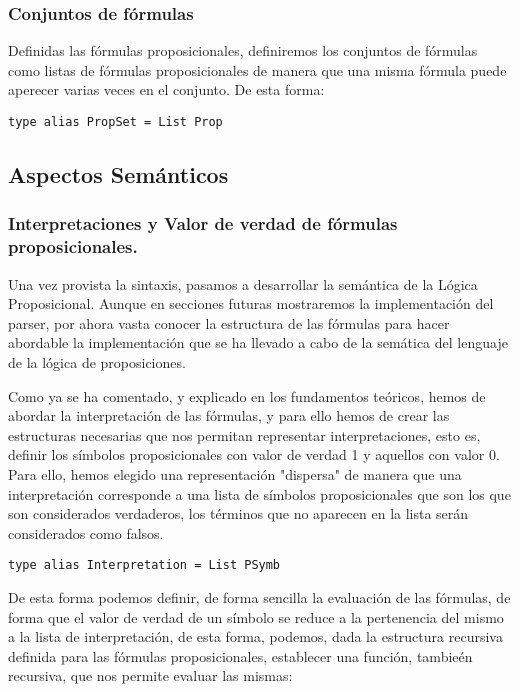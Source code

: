 \documentclass[a4paper]{report}
\begin{document}
\subsubsection{Conjuntos de fórmulas}

Definidas las fórmulas proposicionales, definiremos los conjuntos de fórmulas como listas de fórmulas proposicionales de manera que una misma fórmula puede aperecer varias veces en el conjunto. De esta forma: \\

\begin{lstlisting}[caption= Definición de Conjunto de Fórmulas como Lista de Fórmulas Proposicionales]
type alias PropSet = List Prop
\end{lstlisting}

\subsection{Aspectos Semánticos}
\subsubsection{Interpretaciones y Valor de verdad de fórmulas proposicionales. }

Una vez provista la sintaxis, pasamos a desarrollar la semántica de la Lógica Proposicional. Aunque en secciones futuras mostraremos la implementación del parser, por ahora vasta conocer la estructura de las fórmulas para hacer abordable la implementación que se ha llevado a cabo de la semática del lenguaje de la lógica de proposiciones.

Como ya se ha comentado, y explicado en los fundamentos teóricos, hemos de abordar la interpretación de las fórmulas, y para ello hemos de crear las estructuras necesarias que nos permitan representar interpretaciones, esto es, definir los símbolos proposicionales con valor de verdad 1 y aquellos con valor 0. Para ello, hemos elegido una representación "dispersa" de manera que una interpretación corresponde a una lista de símbolos proposicionales que son los que son considerados verdaderos, los términos que no aparecen en la lista serán considerados como falsos.\\

\begin{lstlisting}[caption= Definición de Interpretación como Lista de Símbolos Proposicionales]
type alias Interpretation = List PSymb
\end{lstlisting}

De esta forma podemos definir, de forma sencilla la evaluación de las fórmulas, de forma que el valor de verdad de un símbolo se reduce a la pertenencia del mismo a la lista de interpretación, de esta forma, podemos, dada la estructura recursiva definida para las fórmulas proposicionales, establecer una función, tambieén recursiva, que nos permite evaluar las mismas:
\end{document}
